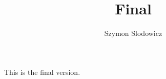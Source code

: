 \documentclass[10pt,a4paper]{article}
\title{Final}
\author{Szymon Slodowicz}
\begin{document}
	This is the final version.
\end{document}
